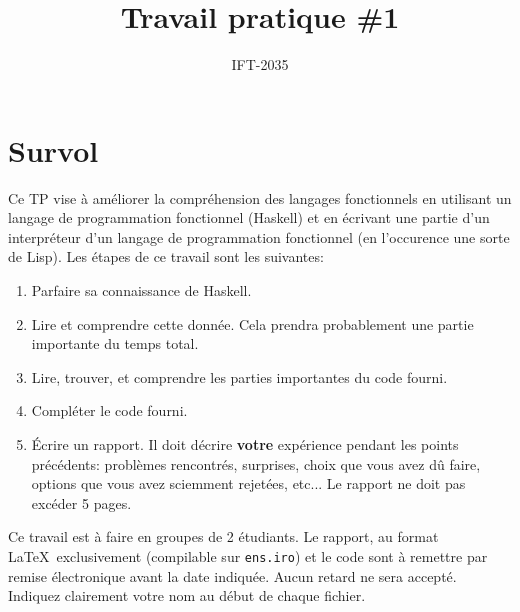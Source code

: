 \documentclass{article}
\title{Travail pratique \#1}
\author{IFT-2035}
\begin{document}
\maketitle

\newcommand \mML {\ensuremath\mu\textsl{ML}}
\newcommand \kw [1] {\textsf{#1}}
\newcommand \id [1] {\textsl{#1}}
\newcommand \punc [1] {\kw{`#1'}}
\newcommand \str [1] {\texttt{"#1"}}
\newenvironment{outitemize}{
  \begin{itemize}
  \let \origitem \item \def \item {\origitem[]\hspace{-18pt}}
}{
  \end{itemize}
}
\newcommand \Align [2][t] {\begin{array}[#1]{@{}l} #2 \end{array}}

\section{Survol}

Ce TP vise à améliorer la compréhension des langages fonctionnels en
utilisant un langage de programmation fonctionnel (Haskell) et en écrivant
une partie d'un interpréteur d'un langage de programmation fonctionnel (en
l'occurence une sorte de Lisp).  Les étapes de ce travail sont les suivantes:
\begin{enumerate}
\item Parfaire sa connaissance de Haskell.
\item Lire et comprendre cette donnée.  Cela prendra probablement une partie
  importante du temps total.
\item Lire, trouver, et comprendre les parties importantes du code fourni.
\item Compléter le code fourni.
\item Écrire un rapport.  Il doit décrire \textbf{votre} expérience pendant
  les points précédents: problèmes rencontrés, surprises, choix que vous
  avez dû faire, options que vous avez sciemment rejetées, etc...  Le
  rapport ne doit pas excéder 5 pages.
\end{enumerate}

Ce travail est à faire en groupes de 2 étudiants.  Le rapport, au format
\LaTeX\ exclusivement (compilable sur \texttt{ens.iro}) et le code sont
à remettre par remise électronique avant la date indiquée.  Aucun retard ne
sera accepté.  Indiquez clairement votre nom au début de chaque fichier.
\end{document}
